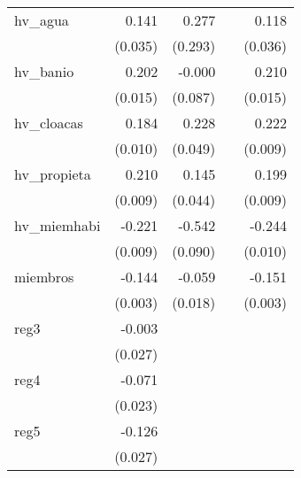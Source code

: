 {\begin{longtable}{l*{4}{D{.}{.}{-1}}}
\addlinespace
hv\_agua     &       0.141\sym{***}&       0.277         &                     &       0.118\sym{**} \\
            &     (0.035)         &     (0.293)         &                     &     (0.036)         \\
\addlinespace
hv\_banio    &       0.202\sym{***}&      -0.000         &                     &       0.210\sym{***}\\
            &     (0.015)         &     (0.087)         &                     &     (0.015)         \\
\addlinespace
hv\_cloacas  &       0.184\sym{***}&       0.228\sym{***}&                     &       0.222\sym{***}\\
            &     (0.010)         &     (0.049)         &                     &     (0.009)         \\
\addlinespace
hv\_propieta &       0.210\sym{***}&       0.145\sym{***}&                     &       0.199\sym{***}\\
            &     (0.009)         &     (0.044)         &                     &     (0.009)         \\
\addlinespace
hv\_miemhabi &      -0.221\sym{***}&      -0.542\sym{***}&                     &      -0.244\sym{***}\\
            &     (0.009)         &     (0.090)         &                     &     (0.010)         \\
\addlinespace
miembros    &      -0.144\sym{***}&      -0.059\sym{**} &                     &      -0.151\sym{***}\\
            &     (0.003)         &     (0.018)         &                     &     (0.003)         \\
\addlinespace
reg3        &      -0.003         &                     &                     &                     \\
            &     (0.027)         &                     &                     &                     \\
\addlinespace
reg4        &      -0.071\sym{**} &                     &                     &                     \\
            &     (0.023)         &                     &                     &                     \\
\addlinespace
reg5        &      -0.126\sym{***}&                     &                     &                     \\
            &     (0.027)         &                     &                     &                     \\

\end{longtable}}
